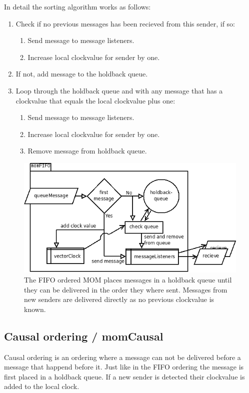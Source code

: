 \documentclass[english]{article}
\begin{document}
In detail the sorting algorithm works as follows:
\begin{enumerate}
\item Check if no previous messages has been recieved from this sender, if so:
	\begin{enumerate}
	\item Send message to message listeners.
	\item Increase local clockvalue for sender by one.
	\end{enumerate}
\item If not, add message to the holdback queue.
\item Loop through the holdback queue and with any message that has a clockvalue that equals the local clockvalue plus one:
	\begin{enumerate}
	\item Send message to message listeners.
	\item Increase local clockvalue for sender by one.
	\item Remove message from holdback queue.
	\end{enumerate}
\end{enumerate}

\begin{figure}
\includegraphics[width=\textwidth]{momFIFO.png}
\caption{The FIFO ordered MOM places messages in a holdback queue until they can be delivered in the order they where sent. Messages from new senders are delivered directly as no previous clockvalue is known.}
\label{fig:fifo}
\end{figure}

\subsection{Causal ordering / momCausal}
\label{mo-causal}
Causal ordering is an ordering where a message can not be delivered before a message that happend before it. Just like in the FIFO ordering the message is first placed in a holdback queue. If a new sender is detected their clockvalue is added to the local clock.
\end{document}
